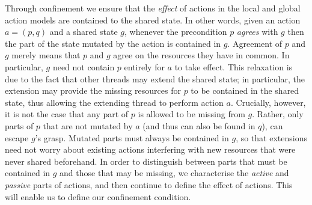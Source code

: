 Through confinement we ensure that the \emph{effect} of actions in the local and global action models are contained to the shared state. In other words, given an action $a = (p,q)$ and a shared state $g$, whenever the precondition $p$ \emph{agrees} with $g$ then the part of the state mutated by the action is contained in $g$. 
Agreement of $p$ and $g$ merely means that $p$ and $g$ agree on the resources they have in common. 
In particular, $g$ need not contain $p$ entirely for $a$ to take effect. This relaxation is due to the fact that other threads may extend the shared state; in particular, the extension may provide the missing resources for $p$ to be contained in the shared state, thus allowing the extending thread to perform action $a$. Crucially, however, it is not the case that any part of $p$ is allowed to be missing from $g$. Rather, only parts of $p$ that are not mutated by $a$ (and thus can also be found in $q$), can escape $g$'s grasp. Mutated parts must always be contained in $g$, so that extensions need not worry about existing actions interfering with new resources that were never shared beforehand. In order to distinguish between parts that must be contained in $g$ and those that may be missing, we characterise the \emph{active} and \emph{passive} parts of actions, and then continue to define the effect of actions. This will enable us to define our confinement condition.

